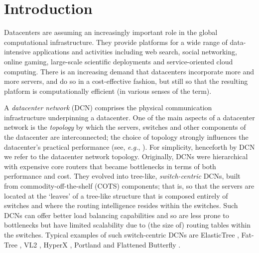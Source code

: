\documentclass{article}
\begin{document}
\section{Introduction}\label{sec:intro}

Datacenters are assuming an increasingly important role in the global computational infrastructure. They provide platforms for a wide range of data-intensive applications and activities including web search, social networking, online gaming, large-scale scientific deployments and service-oriented cloud computing. There is an increasing demand that datacenters incorporate more and more servers, and do so in a cost-effective fashion, but still so that the resulting platform is computationally efficient (in various senses of the term).

A \emph{datacenter network\/} (DCN) comprises the physical communication infrastructure underpinning a datacenter. One of the main aspects of a datacenter network is the \emph{topology\/} by which the servers, switches and other components of the datacenter are interconnected; the choice of topology strongly influences the datacenter's practical performance (see, \emph{e.g.}, \cite{LMV13}). For simplicity, henceforth by DCN we refer to the datacenter network topology. Originally, DCNs were hierarchical with expensive core routers that became bottlenecks in terms of both performance and cost. They evolved into tree-like, \emph{switch-centric\/} DCNs, built from commodity-off-the-shelf (COTS) components; that is, so that the servers are located at the `leaves' of a tree-like structure that is composed entirely of switches and where the routing intelligence resides within the switches. Such DCNs can offer better load balancing capabilities and so are less prone to bottlenecks but have limited scalability due to (the size of) routing tables within the switches. Typical examples of such switch-centric DCNs are ElasticTree \cite{HSM06}, Fat-Tree \cite{ALV08}, VL2 \cite{GHJ09}, HyperX \cite{ABD09}, Portland \cite{MPF09} and Flattened Butterfly \cite{AMW10}. 
\end{document}
